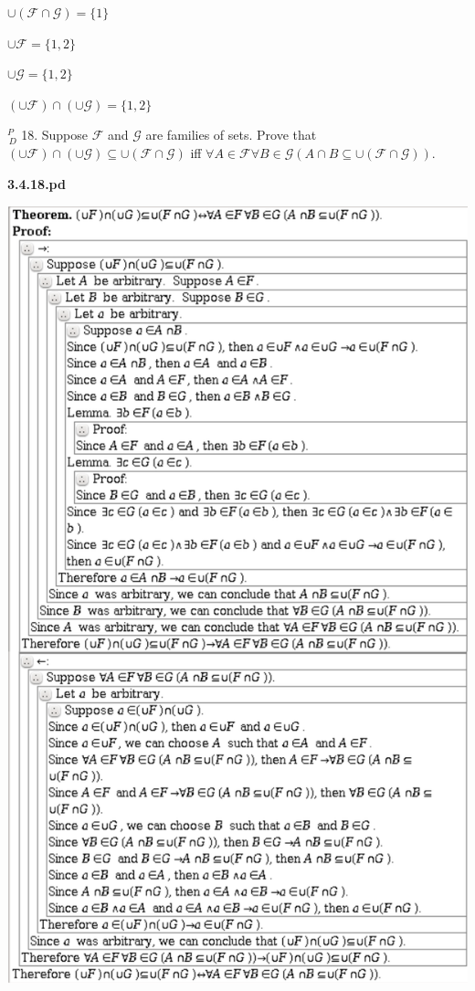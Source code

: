 \documentclass{article}
\begin{document}
$\cup (\mathcal{F} \cap \mathcal{G}) = \{1\}$

$\cup \mathcal{F} = \{1, 2\}$

$\cup \mathcal{G} = \{1, 2\}$

$(\cup \mathcal{F}) \cap (\cup \mathcal{G}) = \{1,2\}$

\vspace{30pt}

$^{\textit{P}}_{\, \textit{D}}$ 18. Suppose $\mathcal{F}$ and $\mathcal{G}$ are families of sets. Prove that $(\cup\mathcal{F}) \cap (\cup\mathcal{G}) \subseteq \cup(\mathcal{F} \cap \mathcal{G})$ iff $\forall A \in \mathcal{F} \forall B \in \mathcal{G}(A \cap B \subseteq \cup(\mathcal{F} \cap \mathcal{G}))$.
\vspace{30pt}

\textbf{3.4.18.pd}
\vspace{10pt}

\includegraphics[scale=0.15]{3_4_18}
\end{document}
